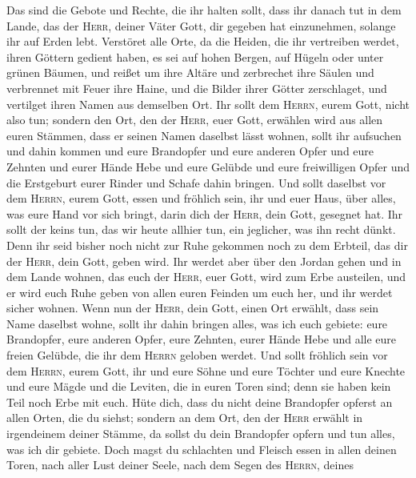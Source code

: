  Das sind die Gebote und Rechte, die ihr halten sollt,
dass ihr danach tut in dem Lande, das der \textsc{Herr}, deiner Väter
Gott, dir gegeben hat einzunehmen, solange ihr auf Erden lebt.
 Verstöret alle Orte, da die Heiden, die ihr vertreiben
werdet, ihren Göttern gedient haben, es sei auf hohen Bergen, auf Hügeln
oder unter grünen Bäumen,  und reißet um ihre Altäre und
zerbrechet ihre Säulen und verbrennet mit Feuer ihre Haine, und die
Bilder ihrer Götter zerschlaget, und vertilget ihren Namen aus demselben
Ort.  Ihr sollt dem \textsc{Herrn}, eurem Gott, nicht also
tun;  sondern den Ort, den der \textsc{Herr}, euer Gott,
erwählen wird aus allen euren Stämmen, dass er seinen Namen daselbst
lässt wohnen, sollt ihr aufsuchen und dahin kommen  und
eure Brandopfer und eure anderen Opfer und eure Zehnten und eurer Hände
Hebe und eure Gelübde und eure freiwilligen Opfer und die Erstgeburt
eurer Rinder und Schafe dahin bringen.  Und sollt daselbst
vor dem \textsc{Herrn}, eurem Gott, essen und fröhlich sein, ihr und
euer Haus, über alles, was eure Hand vor sich bringt, darin dich der
\textsc{Herr}, dein Gott, gesegnet hat.  Ihr sollt der
keins tun, das wir heute allhier tun, ein jeglicher, was ihn recht
dünkt.  Denn ihr seid bisher noch nicht zur Ruhe gekommen
noch zu dem Erbteil, das dir der \textsc{Herr}, dein Gott, geben wird.
 Ihr werdet aber über den Jordan gehen und in dem Lande
wohnen, das euch der \textsc{Herr}, euer Gott, wird zum Erbe austeilen,
und er wird euch Ruhe geben von allen euren Feinden um euch her, und ihr
werdet sicher wohnen.  Wenn nun der \textsc{Herr}, dein
Gott, einen Ort erwählt, dass sein Name daselbst wohne, sollt ihr dahin
bringen alles, was ich euch gebiete: eure Brandopfer, eure anderen
Opfer, eure Zehnten, eurer Hände Hebe und alle eure freien Gelübde, die
ihr dem \textsc{Herrn} geloben werdet.  Und sollt
fröhlich sein vor dem \textsc{Herrn}, eurem Gott, ihr und eure Söhne und
eure Töchter und eure Knechte und eure Mägde und die Leviten, die in
euren Toren sind; denn sie haben kein Teil noch Erbe mit euch.
 Hüte dich, dass du nicht deine Brandopfer opferst an
allen Orten, die du siehst;  sondern an dem Ort, den der
\textsc{Herr} erwählt in irgendeinem deiner Stämme, da sollst du dein
Brandopfer opfern und tun alles, was ich dir gebiete. 
Doch magst du schlachten und Fleisch essen in allen deinen Toren, nach
aller Lust deiner Seele, nach dem Segen des \textsc{Herrn}, deines

